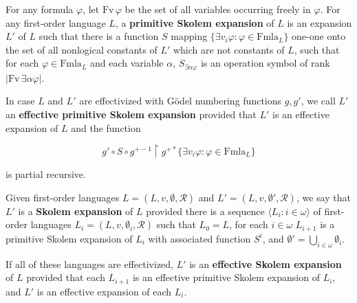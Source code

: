 For any formula $\varphi$, let $\text{Fv}\,\varphi$ be the set of all variables occurring freely in $\varphi$. For any first-order language $L$, a \textbf{primitive Skolem expansion} of $L$ is an expansion $L'$ of $L$ such that there is a function $S$ mapping $\{\exists v_i \varphi : \varphi \in \text{Fmla}_L\}$ one-one onto the set of all nonlogical constants of $L'$ which are not constants of $L$, such that for each $\varphi \in \text{Fmla}_L$ and each variable $\alpha$, $S_{\exists \alpha \varphi}$ is an operation symbol of rank $|\text{Fv}\,\exists \alpha \varphi|$.

In case $L$ and $L'$ are effectivized with Gödel numbering functions $g, g'$, we call $L'$ an \textbf{effective primitive Skolem expansion} provided that $L'$ is an effective expansion of $L$ and the function

$$g' \circ S \circ g^{+-1} \upharpoonright g^{+*} \{\exists v_i \varphi : \varphi \in \text{Fmla}_L\}$$

is partial recursive.

Given first-order languages $L = (L, v, \emptyset, \mathcal{R})$ and $L' = (L, v, \emptyset', \mathcal{R})$, we say that $L'$ is a \textbf{Skolem expansion} of $L$ provided there is a sequence $\langle L_i : i \in \omega \rangle$ of first-order languages $L_i = (L, v, \emptyset_i, \mathcal{R})$ such that $L_0 = L$, for each $i \in \omega$ $L_{i+1}$ is a primitive Skolem expansion of $L_i$ with associated function $S^i$, and $\emptyset' = \bigcup_{i \in \omega} \emptyset_i$.

If all of these languages are effectivized, $L'$ is an \textbf{effective Skolem expansion} of $L$ provided that each $L_{i+1}$ is an effective primitive Skolem expansion of $L_i$, and $L'$ is an effective expansion of each $L_i$.
